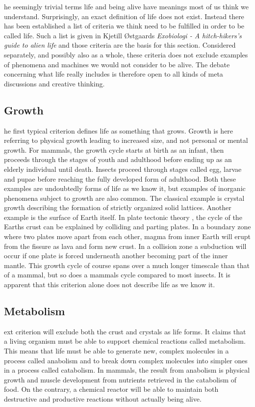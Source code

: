 \noindent
{}he seemingly trivial terms life and being alive have meanings most of us think we understand.
Surprisingly, an exact definition of life does not exist.
Instead there has been established a list of criteria we think need to be fulfilled in order to be called life.
Such a list is given in Kjetill Østgaards \textit{Exobiologi - A hitch-hikers's guide to alien life} \cite{Exoboken} and those criteria are the basis for this section.
Considered separately, and possibly also as a whole, these criteria does not exclude examples of phenomena and machines we would not consider to be alive.
The debate concerning what life really includes is therefore open to all kinds of meta discussions and creative thinking.

\subsection{Growth}
he first typical criterion defines life as something that grows.
Growth is here referring to physical growth leading to increased size, and not personal or mental growth.
For mammals, the growth cycle starts at birth as an infant, then proceeds through the stages of youth and adulthood before ending up as an elderly individual until death.
Insects proceed through stages called egg, larvae and pupae before reaching the fully developed form of adulthood.
Both these examples are undoubtedly forms of life as we know it, but examples of inorganic phenomena subject to growth are also common.
The classical example is crystal growth describing the formation of strictly organized solid lattices.
Another example is the surface of Earth itself.
In plate tectonic theory \cite{tectonic}, the cycle of the Earths crust can be explained by colliding and parting plates.
In a boundary zone where two plates move apart from each other, magma from inner Earth will erupt from the fissure as lava and form new crust.
In a collision zone a subduction will occur if one plate is forced underneath another becoming part of the inner mantle.
This growth cycle of course spans over a much longer timescale than that of a mammal, but so does a mammals cycle compared to most insects.
It is apparent that this criterion alone does not describe life as we know it.

\subsection{Metabolism}
ext criterion will exclude both the crust and crystals as life forms.
It claims that a living organism must be able to support chemical reactions called metabolism.
This means that life must be able to generate new, complex molecules in a process called anabolism and to break down complex molecules into simpler ones in a process called catabolism.
In mammals, the result from anabolism is physical growth and muscle development from nutrients retrieved in the catabolism of food.
On the contrary, a chemical reactor will be able to maintain both destructive and productive reactions without actually being alive.

